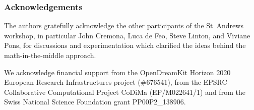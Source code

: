 \subsubsection*{Acknowledgements}

The authors gratefully acknowledge the other participants of the St~Andrews workshop, in
particular John Cremona, Luca de Feo, Steve Linton, and Viviane Pons, for discussions and
experimentation which clarified the ideas behind the math-in-the-middle approach.

We acknowledge financial support from the OpenDreamKit Horizon 2020 European Research
Infrastructures project (\#676541), from the EPSRC Collaborative Computational Project
CoDiMa (EP/M022641/1) and from the Swiss National Science Foundation grant PP00P2\_138906.


